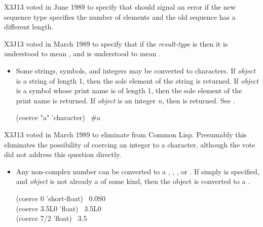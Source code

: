 \begin{defun}[Function]
\begin{newer}
X3J13 voted in June 1989  to specify that
 should signal an error if the new sequence type specifies the
number of elements and the old sequence has a different length.
\end{newer}

\begin{newer}
X3J13 voted in March 1989 
to specify that if the {\it result-type} is 
then it is understood to mean ,
and  is understood to mean .
\end{newer}

\begin{obsolete}
\begin{itemize}
\item
Some strings, symbols, and integers may be converted to characters.
If {\it object} is a string of length 1, then the
sole element of the string is returned.  If {\it object} is a symbol
whose print name is of length 1, then the sole element of the print name
is returned.  If {\it object} is an integer {\it n}, then 
is returned.  See .
\begin{lisp}
(coerce "a" 'character) \EV\ \#{\Xbackslash}a
\end{lisp}
\end{itemize}
\end{obsolete}

\begin{newer}
X3J13 voted in March 1989 
to eliminate  from Common Lisp.
Presumably this eliminates the possibility of coercing an
integer to a character, although the vote did not address
this question directly.
\end{newer}

\begin{itemize}
\item
Any non-complex number can be converted to a ,
, , or .  If simply 
is specified, and {\it object} is not already a  of some kind, then
the object is converted to a .
\begin{lisp}
(coerce 0 'short-float) \EV\ 0.0S0 \\
(coerce 3.5L0 'float) \EV\ 3.5L0 \\
(coerce 7/2 'float) \EV\ 3.5
\end{lisp}


\end{itemize}
\end{defun}

